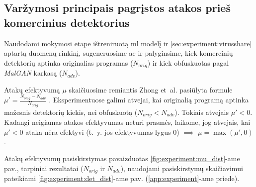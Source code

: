 \clearpage
\subsection{Varžymosi principais pagrįstos atakos prieš komercinius detektorius}

Naudodami mokymosi etape ištreniruotą \acs{ml} modelį ir
\ref{sec:experiment:virusshare} aptartą duomenų rinkinį, sugeneruosime \acs{ae}
ir palyginsime, kiek komercinių detektorių aptinka originalias programas
($N_{orig}$) ir kiek obfuskuotas pagal \textit{MalGAN} karkasą ($N_{adv}$).

Atakų efektyvumą $\mu$ skaičiuosime remiantis Zhong et~al. pasiūlyta formule
$\mu' = \frac{N_{orig} - N_{adv}}{N_{orig}}$
\cite{zhongMalFoxCamouflagedAdversarial2024}. Eksperimentuose galimi atvejai, kai originalią programą aptinka mažesnis detektorių kiekis, nei obfuskuotą ($N_{orig} < N_{adv}$). Tokiais atvejais $\mu' < 0$. Kadangi neigiamas atakos efektyvumas neturi prasmės, laikome, jog atvejais, kai $\mu' < 0$ ataka nėra efektyvi (t.~y. jos efektyvumas lygus $0$) $\implies$ $\mu = \max{(\mu', 0)}$. 

Atakų efektyvumų pasiskirstymas pavaizduotas \ref{fig:experiment:mu_dist}-ame pav., tarpiniai rezultatai ($N_{orig}$ ir $N_{adv}$), naudojami pasiskirstymų skaičiavimui pateikiami \ref{fig:experiment:det_dist}-ame pav. (\ref{app:experiment}-ame priede).

